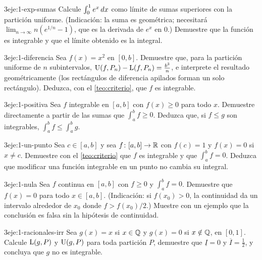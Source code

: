 \begin{ejercicio}{3}{eje:1-exp-sumas}
Calcule $\int_0^1e^{x}\mathop{}\!d x$ como límite de sumas superiores con la partición uniforme. (Indicación: la suma es geométrica; necesitará $\lim_{n\to\infty}n(e^{1/n}-1)$, que es la derivada de $e^{x}$ en $0$.) Demuestre que la función es integrable y que el límite obtenido es la integral.
\end{ejercicio}

\begin{ejercicio}{3}{eje:1-diferencia}
Sea $f(x)=x^{2}$ en $[0,b]$. Demuestre que, para la partición uniforme de $n$ subintervalos, $\operatorname{U}(f,P_n)-\operatorname{L}(f,P_n)=\frac{b^{3}}{n}$, e interprete el resultado geométricamente (los rectángulos de diferencia apilados forman un solo rectángulo). Deduzca, con el \cref{teo:criterio}, que $f$ es integrable.
\end{ejercicio}

\begin{ejercicio}{3}{eje:1-positiva}
Sea $f$ integrable en $[a,b]$ con $f(x)\ge0$ para todo $x$. Demuestre directamente a partir de las sumas que $\int_a^b f\ge0$. Deduzca que, si $f\le g$ son integrables, $\int_a^b f\le\int_a^b g$.
\end{ejercicio}

\begin{ejercicio}{3}{eje:1-un-punto}
Sea $c\in[a,b]$ y sea $f\colon[a,b]\to\mathbb{R}$ con $f(c)=1$ y $f(x)=0$ si $x\neq c$. Demuestre con el \cref{teo:criterio} que $f$ es integrable y que $\int_a^b f=0$. Deduzca que modificar una función integrable en un punto no cambia su integral.
\end{ejercicio}

\begin{ejercicio}{3}{eje:1-nula}
Sea $f$ continua en $[a,b]$ con $f\ge0$ y $\int_a^b f=0$. Demuestre que $f(x)=0$ para todo $x\in[a,b]$. (Indicación: si $f(x_0)>0$, la continuidad da un intervalo alrededor de $x_0$ donde $f>f(x_0)/2$.) Muestre con un ejemplo que la conclusión es falsa sin la hipótesis de continuidad.
\end{ejercicio}

\begin{ejercicio}{3}{eje:1-racionales-irr}
Sea $g(x)=x$ si $x\in\mathbb{Q}$ y $g(x)=0$ si $x\notin\mathbb{Q}$, en $[0,1]$. Calcule $\operatorname{L}(g,P)$ y $\operatorname{U}(g,P)$ para toda partición $P$, demuestre que $\underline{I}=0$ y $\overline{I}=\frac12$, y concluya que $g$ no es integrable.
\end{ejercicio}
